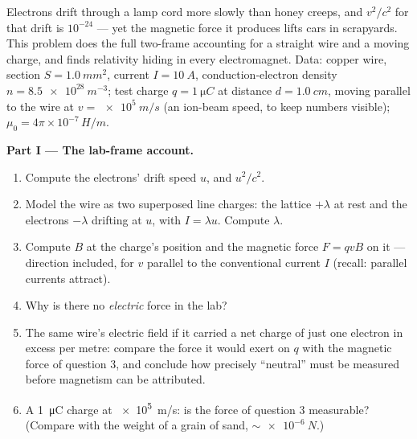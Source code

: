 \begin{problem}\label{pb:b3:covariant-electromagnetism:1}
Electrons drift through a lamp cord more slowly than honey creeps,
and $v^2/c^2$ for that drift is $10^{-24}$ --- yet the magnetic force
it produces lifts cars in scrapyards. This problem does the full
two-frame accounting for a straight wire and a moving charge, and
finds relativity hiding in every electromagnet. Data: copper wire,
section $S = \qty{1.0}{mm^2}$, current $I = \qty{10}{A}$,
conduction-electron density $n = \qty{8.5e28}{m^{-3}}$; test charge
$q = \qty{1}{\micro C}$ at distance $d = \qty{1.0}{cm}$, moving
parallel to the wire at $v = \qty{e5}{m/s}$ (an ion-beam speed, to
keep numbers visible); $\mu_0 = 4\pi\times10^{-7}\,\unit{H/m}$.

\medskip\noindent\textbf{Part I --- The lab-frame account.}
\begin{enumerate}
  \item Compute the electrons' drift speed $u$, and $u^2/c^2$.
  \item Model the wire as two superposed line charges: the lattice
        $+\lambda$ at rest and the electrons $-\lambda$ drifting at
        $u$, with $I = \lambda u$. Compute $\lambda$.
  \item Compute $B$ at the charge's position and the magnetic force
        $F = qvB$ on it --- direction included, for $v$ parallel to
        the conventional current $I$ (recall: parallel currents
        attract).
  \item Why is there no \emph{electric} force in the lab?
  \item The same wire's electric field if it carried a net charge of
        just one electron in excess per metre: compare the force it
        would exert on $q$ with the magnetic force of question 3,
        and conclude how precisely ``neutral'' must be measured
        before magnetism can be attributed.
  \item A \qty{1}{\micro C} charge at \qty{e5}{m/s}: is the force of
        question 3 measurable? (Compare with the weight of a grain
        of sand, $\sim\qty{e-6}{N}$.)
\end{enumerate}


\end{problem}
